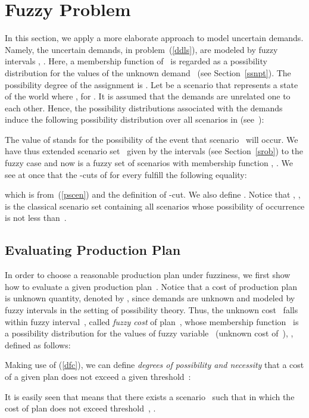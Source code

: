 \documentclass[11pt]{article}
\begin{document}
\section{Fuzzy Problem}
\label{sfp}

In this section, we apply a more elaborate approach to model 
uncertain demands. 
Namely, 
the  uncertain demands, in problem~(\ref{ddls}), are
modeled by fuzzy intervals , .
Here,
a membership function of~ is regarded as
a possibility distribution
for the values of the unknown demand~ (see Section~\ref{ssnpt}).
The possibility degree of the assignment 
 is
.
Let 
be a scenario that represents a  state of the world
where
, for .
It is assumed that 
the demands are unrelated  one to each other. 
Hence,
the 
possibility distributions
 associated with the demands induce the following possibility distribution over all scenarios in  (see~\cite{DFG03}):

 The value of  stands for the possibility of the event that 
 scenario~ will occur.
 We have thus extended scenario set~ given by the intervals  
 (see Section~\ref{srob}) to the fuzzy case and now
  is a fuzzy
 set of scenarios with membership function
 , .
We see at once that the  -cuts of   for every 
fulfill the following equality:

which is from~(\ref{pscen}) and the definition of -cut.
We also define .
Notice that , , is the classical scenario set containing all scenarios whose possibility of occurrence is not less than~.

\subsection{Evaluating  Production Plan}

In order to  choose a reasonable production plan under fuzziness, we 
first show how to evaluate a given production plan~.
Notice that a cost of  production plan~ is unknown quantity, denoted by , since demands are unknown and
modeled by fuzzy intervals in the setting of possibility theory.
Thus, the unknown cost~ falls within fuzzy interval~, called
\emph{fuzzy cost} of plan~, whose 
 membership function~
is a  possibility distribution for the 
  values of  fuzzy variable~
  (unknown cost of~), ,
defined as follows:

Making use of (\ref{dfc}), we can define \emph{degrees of possibility and
necessity} that a cost of 
a given plan    does not exceed a given threshold~:

It is easily seen that  means that there exists a scenario~
such that  in which the cost of plan  
does not exceed threshold~, .
\end{document}
